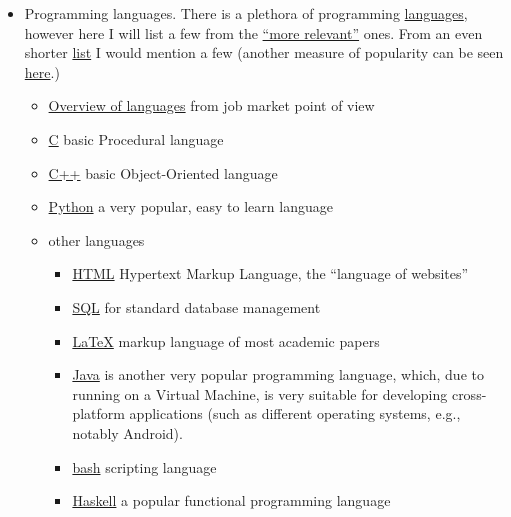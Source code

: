 \documentclass{article}
\begin{document}
\begin{itemize}
    
    \item Programming languages. There is a plethora of programming \href{https://www.levenez.com/lang/}{languages}, however here I will list a few from the \href{http://rigaux.org/language-study/diagram-light.pdf}{``more relevant''} ones. From an even shorter \href{https://www.computerscience.org/resources/computer-programming-languages/}{list} I would mention a few (another measure of popularity can be seen \href{https://www.tiobe.com/tiobe-index/}{here}.)
    \begin{itemize}
        \item \href{https://www.youtube.com/watch?v=poJfwre2PIs}{Overview of languages} from job market point of view
        \item \href{https://en.wikipedia.org/wiki/C_(programming_language)}{C} basic Procedural language 
        \item \href{https://isocpp.org/}{C++} basic Object-Oriented language
        \item \href{https://www.python.org/}{Python} a very popular, easy to learn language
        \item other languages
        \begin{itemize}
        \item \href{https://en.wikipedia.org/wiki/HTML}{HTML} Hypertext Markup Language, the ``language of websites''
        \item \href{https://en.wikipedia.org/wiki/SQL}{SQL} for standard database management
        \item \href{https://www.latex-project.org/}{LaTeX} markup language of most academic papers
        \item \href{https://en.wikipedia.org/wiki/Java_(programming_language)}{Java} is another very popular programming language, which, due to running on a Virtual Machine, is very suitable for developing cross-platform applications (such as different operating systems, e.g., notably Android).
        \item \href{https://www.gnu.org/software/bash/}{bash} scripting language
        \item \href{https://www.haskell.org/}{Haskell} a popular functional programming language
        \end{itemize}
    \end{itemize}
    

\end{itemize}
\end{document}
